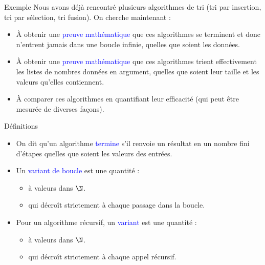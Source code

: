\documentclass[10pt]{beamer}
\begin{document}
\begin{frame}[fragile]{\Ctitle}{\stitle}
	\begin{exampleblock}{Exemple}
		Nous avons déjà rencontré plusieurs algorithmes de tri (tri par insertion, tri par sélection, tri fusion). On cherche maintenant :
		\begin{itemize}
			\item <2-> À obtenir une \textcolor{blue}{preuve mathématique} que ces algorithmes se terminent et donc n'entrent jamais dans une boucle infinie, quelles que soient les données.
			\item <3-> À obtenir une \textcolor{blue}{preuve mathématique} que ces algorithmes trient effectivement les listes de nombres données en argument, quelles que soient leur taille et les valeurs qu'elles contiennent.
			\item <4-> À comparer ces algorithmes en quantifiant leur efficacité (qui peut être mesurée de diverses façons).
		\end{itemize}
	\end{exampleblock}
\end{frame}

\begin{frame}[fragile]{\Ctitle}{\stitle}
	\begin{block}{Définitions}
		\begin{itemize}
			\item On dit qu'un algorithme \textcolor{blue}{termine} s'il renvoie un résultat en un nombre fini d'étapes quelles que soient les valeurs des entrées.
			\item<2-> Un \textcolor{blue}{variant de boucle} est une quantité :
				\begin{itemize}
					\item<3-> à valeurs dans $\N$.
					\item<4-> qui décroît strictement à chaque passage dans la boucle.
				\end{itemize}
			\item<5-> Pour un algorithme récursif, un \textcolor{blue}{variant} est une quantité :
				\begin{itemize}
					\item<6-> à valeurs dans $\N$.
					\item<7-> qui décroît strictement à chaque appel récursif.
				\end{itemize}
		\end{itemize}
	\end{block}
\end{frame}
\end{document}
